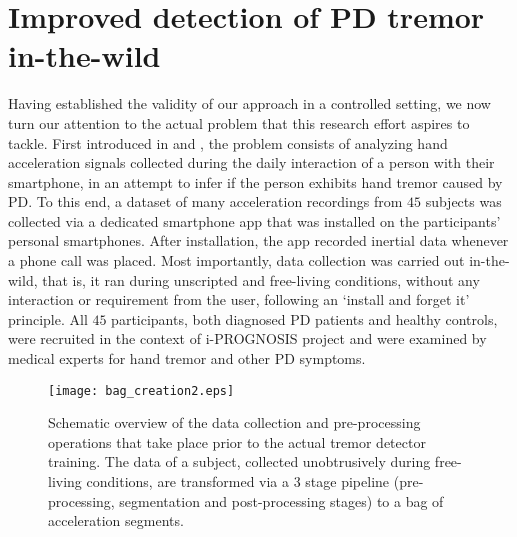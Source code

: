 \documentclass[journal,twoside,web]{ieeecolor}
\begin{document}
\section{Improved detection of PD tremor in-the-wild} \label{sec:tremor_exp} 
Having established the validity of our approach in a controlled setting, we 
now turn our attention to the actual problem that this research effort
aspires to tackle.
First introduced in \cite{papadopoulos2019multiple} and
\cite{alpapado2019tremor}, the problem consists of analyzing hand acceleration
signals collected during the daily interaction of a person with their
smartphone, in an attempt to infer if the person exhibits hand tremor caused by
PD. To this end, a dataset of many acceleration recordings from $45$ subjects
was collected via a dedicated smartphone app that was installed on the
participants' personal smartphones. After installation, the app recorded inertial data whenever
a phone call was placed. Most importantly, data collection was carried out 
in-the-wild, that is, it ran during unscripted and free-living conditions,
without any interaction or requirement from the user, following an `install and
forget it' principle.   All $45$ participants, both diagnosed PD patients and healthy
controls, were recruited in the context of i-PROGNOSIS
project \cite{lisa_klingelhoefer_2017_1199554} and were
examined by medical experts for hand tremor and other PD symptoms. 

\begin{figure*}[!h]
	\centering
	\texttt{[image: bag\_creation2.eps]}
        \caption{Schematic overview of the data collection and pre-processing
          operations that take place prior to the actual tremor detector
          training. The data of a subject, collected unobtrusively during
          free-living conditions, are transformed via a 3 stage pipeline
          (pre-processing, segmentation and post-processing stages) to a bag of
        acceleration segments.}
	\label{fig:bag_creation}
\end{figure*}
\end{document}
